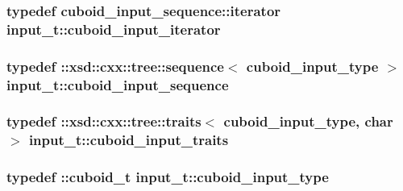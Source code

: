 \subsubsection[{\texorpdfstring{cuboid\+\_\+input\+\_\+iterator}{cuboid_input_iterator}}]{\setlength{\rightskip}{0pt plus 5cm}typedef cuboid\+\_\+input\+\_\+sequence\+::iterator {\bf input\+\_\+t\+::cuboid\+\_\+input\+\_\+iterator}}\hypertarget{classinput__t_aa4ecd719f9c1e557f73c163c723259f2}{}\label{classinput__t_aa4ecd719f9c1e557f73c163c723259f2}
\subsubsection[{\texorpdfstring{cuboid\+\_\+input\+\_\+sequence}{cuboid_input_sequence}}]{\setlength{\rightskip}{0pt plus 5cm}typedef \+::xsd\+::cxx\+::tree\+::sequence$<$ {\bf cuboid\+\_\+input\+\_\+type} $>$ {\bf input\+\_\+t\+::cuboid\+\_\+input\+\_\+sequence}}\hypertarget{classinput__t_a5aef33216e01e60c197cea604a519ab4}{}\label{classinput__t_a5aef33216e01e60c197cea604a519ab4}
\subsubsection[{\texorpdfstring{cuboid\+\_\+input\+\_\+traits}{cuboid_input_traits}}]{\setlength{\rightskip}{0pt plus 5cm}typedef \+::xsd\+::cxx\+::tree\+::traits$<$ {\bf cuboid\+\_\+input\+\_\+type}, char $>$ {\bf input\+\_\+t\+::cuboid\+\_\+input\+\_\+traits}}\hypertarget{classinput__t_a6d747b3e200566247dcf36dd80109730}{}\label{classinput__t_a6d747b3e200566247dcf36dd80109730}
\subsubsection[{\texorpdfstring{cuboid\+\_\+input\+\_\+type}{cuboid_input_type}}]{\setlength{\rightskip}{0pt plus 5cm}typedef \+::{\bf cuboid\+\_\+t} {\bf input\+\_\+t\+::cuboid\+\_\+input\+\_\+type}}\hypertarget{classinput__t_ab3172aa59d0cc9b2d4c5380d9cec72c3}{}\label{classinput__t_ab3172aa59d0cc9b2d4c5380d9cec72c3}
